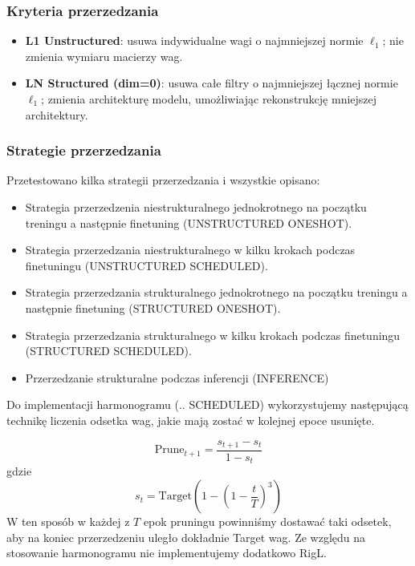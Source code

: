 \documentclass[12pt,twocolumn]{article}
\begin{document}
\subsubsection*{Kryteria przerzedzania}
\begin{itemize}
  \item \textbf{L1 Unstructured}: usuwa indywidualne wagi o najmniejszej
        normie $\ell_1$; nie zmienia wymiaru macierzy wag.
  \item \textbf{LN Structured (dim=0)}: usuwa całe filtry o najmniejszej
        łącznej normie $\ell_1$; zmienia architekturę modelu, umożliwiając
        rekonstrukcję mniejszej architektury.
\end{itemize}

\subsubsection*{Strategie przerzedzania}

Przetestowano kilka strategii przerzedzania i wszystkie opisano:
\begin{itemize}
  \item Strategia przerzedzenia niestrukturalnego jednokrotnego na początku treningu a następnie finetuning (UNSTRUCTURED ONESHOT).
  \item Strategia przerzedzania niestrukturalnego w kilku krokach podczas finetuningu (UNSTRUCTURED SCHEDULED).
  \item Strategia przerzedzania strukturalnego jednokrotnego na początku treningu a następnie finetuning (STRUCTURED ONESHOT).
  \item Strategia przerzedzania strukturalnego w kilku krokach podczas finetuningu (STRUCTURED SCHEDULED).
  \item Przerzedzanie strukturalne podczas inferencji (INFERENCE)
\end{itemize}

Do implementacji harmonogramu (.. SCHEDULED) wykorzystujemy następującą technikę liczenia odsetka wag, jakie mają zostać
w kolejnej epoce usunięte.

\begin{equation}
  \text{Prune}_{t+1} = \frac{s_{t+1} - s_{t}}{1 - s_{t}}
\end{equation}
gdzie
\begin{equation*}
  s_t = \text{Target} (1 - (1- \frac{t}{T})^3)
\end{equation*}
W ten sposób w każdej z $T$ epok pruningu powinniśmy dostawać taki odsetek, aby na koniec przerzedzeniu
uległo dokładnie Target wag. Ze względu na stosowanie harmonogramu nie implementujemy dodatkowo RigL\cite{evci2020rigging}.
\end{document}

